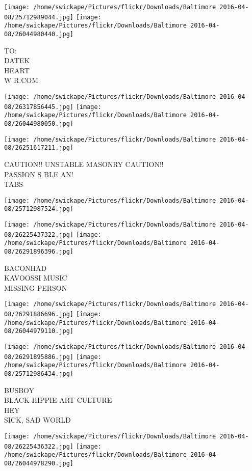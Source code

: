 \documentclass[10pt,letterpaper]{article}
\begin{document}
\texttt{[image: /home/swickape/Pictures/flickr/Downloads/Baltimore 2016-04-08/25712989044.jpg]}
\texttt{[image: /home/swickape/Pictures/flickr/Downloads/Baltimore 2016-04-08/26044980440.jpg]}

TO:\\
DATEK\\
HEART\\
W R.COM
\pagebreak

\texttt{[image: /home/swickape/Pictures/flickr/Downloads/Baltimore 2016-04-08/26317856445.jpg]}
\texttt{[image: /home/swickape/Pictures/flickr/Downloads/Baltimore 2016-04-08/26044980050.jpg]}

\texttt{[image: /home/swickape/Pictures/flickr/Downloads/Baltimore 2016-04-08/26251617211.jpg]}

CAUTION!! UNSTABLE MASONRY CAUTION!!\\
PASSION S BLE AN!\\
TABS
\pagebreak

\texttt{[image: /home/swickape/Pictures/flickr/Downloads/Baltimore 2016-04-08/25712987524.jpg]}

\vspace{0.25in}
\texttt{[image: /home/swickape/Pictures/flickr/Downloads/Baltimore 2016-04-08/26225437322.jpg]}
\texttt{[image: /home/swickape/Pictures/flickr/Downloads/Baltimore 2016-04-08/26291896396.jpg]}

BACONHAD\\
KAVOOSSI MUSIC\\
MISSING PERSON
\pagebreak

\texttt{[image: /home/swickape/Pictures/flickr/Downloads/Baltimore 2016-04-08/26291886696.jpg]}
\texttt{[image: /home/swickape/Pictures/flickr/Downloads/Baltimore 2016-04-08/26044979110.jpg]}

\texttt{[image: /home/swickape/Pictures/flickr/Downloads/Baltimore 2016-04-08/26291895886.jpg]}
\texttt{[image: /home/swickape/Pictures/flickr/Downloads/Baltimore 2016-04-08/25712986434.jpg]}

BUSBOY\\
BLACK HIPPIE ART CULTURE\\
HEY\\
SICK, SAD WORLD
\pagebreak

\texttt{[image: /home/swickape/Pictures/flickr/Downloads/Baltimore 2016-04-08/26225436322.jpg]}
\texttt{[image: /home/swickape/Pictures/flickr/Downloads/Baltimore 2016-04-08/26044978290.jpg]}
\end{document}
